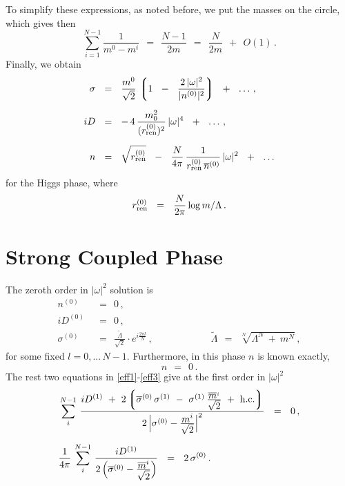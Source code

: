 \documentclass[12pt]{article}
\newcommand{\wt}{\widetilde}
\newcommand{\ov}{\overline}
\newcommand{\lgr}{\left\lgroup}
\newcommand{\rgr}{\right\rgroup}
\newcommand{\nz}{{n^{(0)}}}
\newcommand{\bnz}{{\ov{n}{}^{(0)}}}
\newcommand{\Dz}{{D^{(0)}}}
\newcommand{\Do}{{D^{(1)}}}
\newcommand{\sigz}{{\sigma^{(0)}}}
\newcommand{\sigo}{{\sigma^{(1)}}}
\newcommand{\bsigz}{{\ov{\sigma}{}^{(0)}}}
\newcommand{\rrenz}{{r_\text{ren}^{(0)}}}
\begin{document}
	To simplify these expressions, as noted before, we put the masses on the circle, which gives then
\[
	\sum_{i=1}^{N-1} \frac{1}{m^0 - m^i} ~~=~~ \frac{N-1}{2m} ~~=~~ \frac{N}{2m} ~~+~~ O(1)\,.
\]
	Finally, we obtain 
\begin{align*}
%
	\sigma & ~~=~~ \frac{m^0}{\sqrt{2}}\, \lgr 1 ~~-~~ \frac{2\,|\omega|^2}{|\nz|^2} \rgr ~~+~~ \ldots \,,
	\\[2mm]
%
	i D & ~~=~~ -\, 4\, \frac{m_0^2}{(\rrenz)^2}\, |\omega|^4 ~~+~~ \ldots\,,
	\\[2mm]
%
	n & ~~=~~ \sqrt{\rrenz} ~~-~~ \frac{N}{4\pi}\,\frac{1}{\rrenz\,\bnz}\,|\omega|^2 ~~+~~ \ldots
\end{align*}
	for the Higgs phase, where
\[
	\rrenz ~~=~~ \frac{N}{2\pi}\,{\rm log}\,m/\Lambda\,.
\]

%
%
\section{Strong Coupled Phase}

	The zeroth order in $ |\omega|^2 $ solution is 
\begin{align*}
%
	\nz & ~~=~~ 0\,, \\[2mm]
%
	i \Dz & ~~=~~ 0\,, \\[1mm]
%
	\sigz & ~~=~~ \frac{\wt{\Lambda}}{\sqrt 2}\cdot e^{i\frac{2\pi l}{N}}\,,  
	\qquad\qquad\qquad
	\wt{\Lambda} ~~=~~ \sqrt[N]{ \Lambda^N ~+~ m^N }\,,
\end{align*}
	for some fixed $ l = 0,...\,N-1 $.
	Furthermore, in this phase  $ n $ is known exactly,
\[
	n ~~=~~ 0\,.
\]
	The rest two equations in \eqref{eff1}-\eqref{eff3} give at the first order in $ |\omega|^2 $
\begin{align*}
%
	&
	\sum_{i}^{N-1}\, \frac{ i \Do ~+~ 2 \lgr \bsigz\,\sigo ~-~ 
					\sigo\, \frac{\ov{\displaystyle m}{}^i}{\sqrt{\displaystyle 2}}
				~+~ \text{h.c.} \rgr }
			    { 2\, \Bigl| \sigz - \frac{\displaystyle m^i}{\sqrt{\displaystyle 2}} \Bigr|^2 }
			~~=~~ 0\,,
	\\[2mm]
%
	&
	\frac{1}{4\pi}\, \sum_i^{N-1}\, \frac{i \Do}
				    {2\,\Bigl( \bsigz - \frac{\displaystyle\ov{m}{}^i}{\displaystyle \sqrt{2}} \Bigr) }
			~~=~~ 2\, \sigz\,.
\end{align*}
\end{document}
